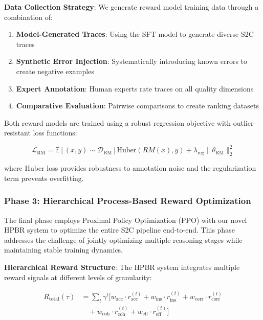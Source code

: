 \documentclass[10pt,twocolumn]{article}
\newcommand{\ssc}{\textsc{S2C}}
\newcommand{\hpbr}{\textsc{HPBR}}
\newcommand{\expectation}[1]{\mathbb{E}\left[#1\right]}
\begin{document}
\textbf{Data Collection Strategy}: We generate reward model training data through a combination of:

\begin{enumerate}[leftmargin=*]
\item \textbf{Model-Generated Traces}: Using the SFT model to generate diverse \ssc{} traces
\item \textbf{Synthetic Error Injection}: Systematically introducing known errors to create negative examples
\item \textbf{Expert Annotation}: Human experts rate traces on all quality dimensions
\item \textbf{Comparative Evaluation}: Pairwise comparisons to create ranking datasets
\end{enumerate}

Both reward models are trained using a robust regression objective with outlier-resistant loss functions:

\begin{equation}
\mathcal{L}_{\text{RM}} = \expectation{(x,y) \sim \mathcal{D}_{\text{RM}}}{\text{Huber}(RM(x), y)} + \lambda_{\text{reg}} \|\theta_{\text{RM}}\|_2^2
\end{equation}

where Huber loss provides robustness to annotation noise and the regularization term prevents overfitting.

\subsubsection{Phase 3: Hierarchical Process-Based Reward Optimization}

The final phase employs Proximal Policy Optimization (PPO) with our novel \hpbr{} system to optimize the entire \ssc{} pipeline end-to-end. This phase addresses the challenge of jointly optimizing multiple reasoning stages while maintaining stable training dynamics.

\textbf{Hierarchical Reward Structure}: The \hpbr{} system integrates multiple reward signals at different levels of granularity:

\begin{align}
R_{\text{total}}(\tau) &= \sum_{t} \gamma^t [w_{\text{acc}} \cdot r_{\text{acc}}^{(t)} + w_{\text{ins}} \cdot r_{\text{ins}}^{(t)} + w_{\text{corr}} \cdot r_{\text{corr}}^{(t)} \\
&\quad + w_{\text{coh}} \cdot r_{\text{coh}}^{(t)} + w_{\text{eff}} \cdot r_{\text{eff}}^{(t)}]
\end{align}
\end{document}
